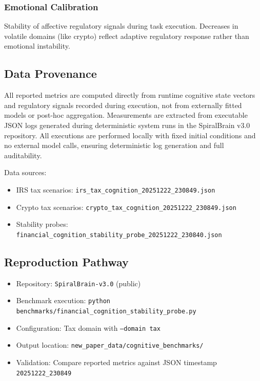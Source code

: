 \documentclass[12pt,a4paper]{article}
\begin{document}
\subsubsection{Emotional Calibration}
Stability of affective regulatory signals during task execution. Decreases in volatile domains (like crypto) reflect adaptive regulatory response rather than emotional instability.

\subsection{Data Provenance}

All reported metrics are computed directly from runtime cognitive state vectors and regulatory signals recorded during execution, not from externally fitted models or post-hoc aggregation. Measurements are extracted from executable JSON logs generated during deterministic system runs in the SpiralBrain v3.0 repository. All executions are performed locally with fixed initial conditions and no external model calls, ensuring deterministic log generation and full auditability.

Data sources:
\begin{itemize}
\item IRS tax scenarios: \texttt{irs\_tax\_cognition\_20251222\_230849.json}
\item Crypto tax scenarios: \texttt{crypto\_tax\_cognition\_20251222\_230849.json}
\item Stability probes: \texttt{financial\_cognition\_stability\_probe\_20251222\_230840.json}
\end{itemize} 
\subsection{Reproduction Pathway}

\begin{itemize}
\item Repository: \texttt{SpiralBrain-v3.0} (public) \cite{SpiralBrainV3}
\item Benchmark execution: \texttt{python benchmarks/financial\_cognition\_stability\_probe.py}
\item Configuration: Tax domain with \texttt{--domain tax}
\item Output location: \texttt{new\_paper\_data/cognitive\_benchmarks/}
\item Validation: Compare reported metrics against JSON timestamp \texttt{20251222\_230849}
\end{itemize}
\end{document}
